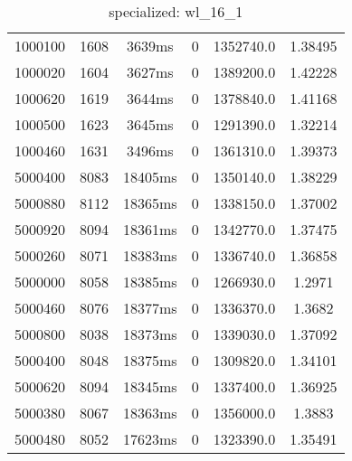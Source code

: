 \documentclass[./main.tex]{subfiles}
\begin{document}
\begin{table}
\begin{tabular}{ c | c | c | c | c | c }
        1000100 & 1608 & 3639ms & 0 & 1352740.0 & 1.38495 \\
        1000020 & 1604 & 3627ms & 0 & 1389200.0 & 1.42228 \\
        1000620 & 1619 & 3644ms & 0 & 1378840.0 & 1.41168 \\
        1000500 & 1623 & 3645ms & 0 & 1291390.0 & 1.32214 \\
        1000460 & 1631 & 3496ms & 0 & 1361310.0 & 1.39373 \\
        \hline
        5000400 & 8083 & 18405ms & 0 & 1350140.0 & 1.38229 \\
        5000880 & 8112 & 18365ms & 0 & 1338150.0 & 1.37002 \\
        5000920 & 8094 & 18361ms & 0 & 1342770.0 & 1.37475 \\
        5000260 & 8071 & 18383ms & 0 & 1336740.0 & 1.36858 \\
        5000000 & 8058 & 18385ms & 0 & 1266930.0 & 1.2971 \\
        5000460 & 8076 & 18377ms & 0 & 1336370.0 & 1.3682 \\
        5000800 & 8038 & 18373ms & 0 & 1339030.0 & 1.37092 \\
        5000400 & 8048 & 18375ms & 0 & 1309820.0 & 1.34101 \\
        \rowcolor{lightgray} 5000620 & 8094 & 18345ms & 0 & 1337400.0 & 1.36925 \\
        5000380 & 8067 & 18363ms & 0 & 1356000.0 & 1.3883 \\
        5000480 & 8052 & 17623ms & 0 & 1323390.0 & 1.35491 \\
    \end{tabular}
    \caption{specialized: wl\_16\_1}
\end{table}
\end{document}
